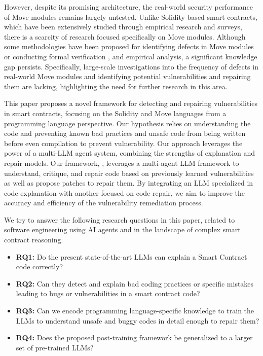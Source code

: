 However, despite its promising architecture, the real-world security performance of Move modules remains largely
untested. Unlike Solidity-based smart contracts, which have been extensively studied through empirical research
and surveys, there is a scarcity of research focused specifically on Move modules. Although some methodologies
have been proposed for identifying defects in Move modules or conducting formal verification \cite{keilty2022model,park2024securing}, and empirical analysis\cite{song2024empirical}, a significant knowledge gap persists. Specifically, large-scale investigations into the frequency of defects
in real-world Move modules and identifying potential vulnerabilities and repairing them are lacking, highlighting the need for further research in this area.

This paper proposes a novel framework for detecting and repairing vulnerabilities in smart contracts, focusing on the Solidity and Move languages from a programming language perspective. Our hypothesis relies on understanding the code and preventing known bad practices and unsafe code from being written before even compilation to prevent vulnerability. Our approach leverages the power of a multi-LLM agent system, combining the strengths of explanation and repair models. Our framework, \sln{}, leverages a multi-agent LLM framework to understand, critique, and repair code based on previously learned vulnerabilities as well as propose patches to repair them. 
%
By integrating an LLM specialized in code explanation with another focused on code repair, we aim to improve the accuracy and efficiency of the vulnerability remediation process.

We try to answer the following research questions in this paper, related to software engineering using AI agents and in the landscape of complex smart contract reasoning.
\begin{itemize}
    \item \textbf{RQ1:} Do the present state-of-the-art LLMs can explain a Smart Contract code correctly?
    \item \textbf{RQ2:} Can they detect and explain bad coding practices or specific mistakes leading to bugs or vulnerabilities in a smart contract code?
    \item \textbf{RQ3:} Can we encode programming language-specific knowledge to train the LLMs to understand unsafe and buggy codes in detail enough to repair them?
    \item \textbf{RQ4:} Does the proposed post-training framework be generalized to a larger set of pre-trained LLMs?
\end{itemize}

